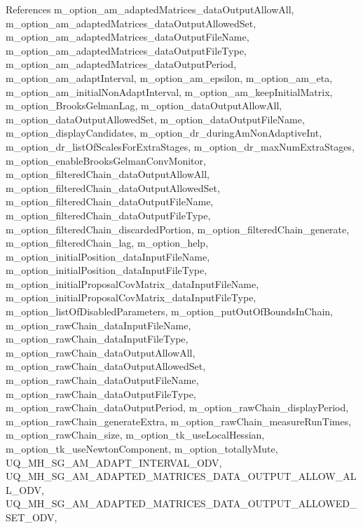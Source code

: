 References m\-\_\-option\-\_\-am\-\_\-adapted\-Matrices\-\_\-data\-Output\-Allow\-All, m\-\_\-option\-\_\-am\-\_\-adapted\-Matrices\-\_\-data\-Output\-Allowed\-Set, m\-\_\-option\-\_\-am\-\_\-adapted\-Matrices\-\_\-data\-Output\-File\-Name, m\-\_\-option\-\_\-am\-\_\-adapted\-Matrices\-\_\-data\-Output\-File\-Type, m\-\_\-option\-\_\-am\-\_\-adapted\-Matrices\-\_\-data\-Output\-Period, m\-\_\-option\-\_\-am\-\_\-adapt\-Interval, m\-\_\-option\-\_\-am\-\_\-epsilon, m\-\_\-option\-\_\-am\-\_\-eta, m\-\_\-option\-\_\-am\-\_\-initial\-Non\-Adapt\-Interval, m\-\_\-option\-\_\-am\-\_\-keep\-Initial\-Matrix, m\-\_\-option\-\_\-\-Brooks\-Gelman\-Lag, m\-\_\-option\-\_\-data\-Output\-Allow\-All, m\-\_\-option\-\_\-data\-Output\-Allowed\-Set, m\-\_\-option\-\_\-data\-Output\-File\-Name, m\-\_\-option\-\_\-display\-Candidates, m\-\_\-option\-\_\-dr\-\_\-during\-Am\-Non\-Adaptive\-Int, m\-\_\-option\-\_\-dr\-\_\-list\-Of\-Scales\-For\-Extra\-Stages, m\-\_\-option\-\_\-dr\-\_\-max\-Num\-Extra\-Stages, m\-\_\-option\-\_\-enable\-Brooks\-Gelman\-Conv\-Monitor, m\-\_\-option\-\_\-filtered\-Chain\-\_\-data\-Output\-Allow\-All, m\-\_\-option\-\_\-filtered\-Chain\-\_\-data\-Output\-Allowed\-Set, m\-\_\-option\-\_\-filtered\-Chain\-\_\-data\-Output\-File\-Name, m\-\_\-option\-\_\-filtered\-Chain\-\_\-data\-Output\-File\-Type, m\-\_\-option\-\_\-filtered\-Chain\-\_\-discarded\-Portion, m\-\_\-option\-\_\-filtered\-Chain\-\_\-generate, m\-\_\-option\-\_\-filtered\-Chain\-\_\-lag, m\-\_\-option\-\_\-help, m\-\_\-option\-\_\-initial\-Position\-\_\-data\-Input\-File\-Name, m\-\_\-option\-\_\-initial\-Position\-\_\-data\-Input\-File\-Type, m\-\_\-option\-\_\-initial\-Proposal\-Cov\-Matrix\-\_\-data\-Input\-File\-Name, m\-\_\-option\-\_\-initial\-Proposal\-Cov\-Matrix\-\_\-data\-Input\-File\-Type, m\-\_\-option\-\_\-list\-Of\-Disabled\-Parameters, m\-\_\-option\-\_\-put\-Out\-Of\-Bounds\-In\-Chain, m\-\_\-option\-\_\-raw\-Chain\-\_\-data\-Input\-File\-Name, m\-\_\-option\-\_\-raw\-Chain\-\_\-data\-Input\-File\-Type, m\-\_\-option\-\_\-raw\-Chain\-\_\-data\-Output\-Allow\-All, m\-\_\-option\-\_\-raw\-Chain\-\_\-data\-Output\-Allowed\-Set, m\-\_\-option\-\_\-raw\-Chain\-\_\-data\-Output\-File\-Name, m\-\_\-option\-\_\-raw\-Chain\-\_\-data\-Output\-File\-Type, m\-\_\-option\-\_\-raw\-Chain\-\_\-data\-Output\-Period, m\-\_\-option\-\_\-raw\-Chain\-\_\-display\-Period, m\-\_\-option\-\_\-raw\-Chain\-\_\-generate\-Extra, m\-\_\-option\-\_\-raw\-Chain\-\_\-measure\-Run\-Times, m\-\_\-option\-\_\-raw\-Chain\-\_\-size, m\-\_\-option\-\_\-tk\-\_\-use\-Local\-Hessian, m\-\_\-option\-\_\-tk\-\_\-use\-Newton\-Component, m\-\_\-option\-\_\-totally\-Mute, U\-Q\-\_\-\-M\-H\-\_\-\-S\-G\-\_\-\-A\-M\-\_\-\-A\-D\-A\-P\-T\-\_\-\-I\-N\-T\-E\-R\-V\-A\-L\-\_\-\-O\-D\-V, U\-Q\-\_\-\-M\-H\-\_\-\-S\-G\-\_\-\-A\-M\-\_\-\-A\-D\-A\-P\-T\-E\-D\-\_\-\-M\-A\-T\-R\-I\-C\-E\-S\-\_\-\-D\-A\-T\-A\-\_\-\-O\-U\-T\-P\-U\-T\-\_\-\-A\-L\-L\-O\-W\-\_\-\-A\-L\-L\-\_\-\-O\-D\-V, U\-Q\-\_\-\-M\-H\-\_\-\-S\-G\-\_\-\-A\-M\-\_\-\-A\-D\-A\-P\-T\-E\-D\-\_\-\-M\-A\-T\-R\-I\-C\-E\-S\-\_\-\-D\-A\-T\-A\-\_\-\-O\-U\-T\-P\-U\-T\-\_\-\-A\-L\-L\-O\-W\-E\-D\-\_\-\-S\-E\-T\-\_\-\-O\-D\-V, 